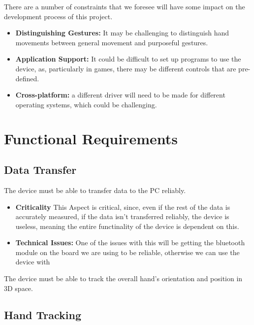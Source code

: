 \documentclass[12pt,a4paper,oneside]{book}
\theoremstyle{plain}
\numberwithin{equation}{chapter}
\newcounter{Chapnum}
\newcounter{Secnum}
\begin{document}
\noindent There are a number of constraints that we foresee will have some impact on the development process of this project.

\begin{itemize}
    \item \textbf{Distinguishing Gestures:} It may be challenging to distinguish hand movements between general movement and purposeful gestures.
    \item \textbf{Application Support:} It could be difficult to set up programs to use the device, as, particularly in games, there may be different controls that are pre-defined.
    \item \textbf{Cross-platform:} a different driver will need to be made for different operating systems, which could be challenging.
\end{itemize}

\chapter*{Functional Requirements}



\section{\textbf{Data Transfer}}

\noindent The device must be able to transfer data to the PC reliably.

\begin{itemize}
    \item \textbf{Criticality} This Aspect is critical, since, even if the rest of the data is accurately measured, if the data isn't transferred reliably, the device is useless, meaning the entire functinality of the device is dependent on this.
    \item \textbf{Technical Issues:} One of the issues with this will be getting the bluetooth module on the board we are using to be reliable, otherwise we can use the device with
\end{itemize}

\noindent The device must be able to track the overall hand's orientation and position in 3D space.

\section{\textbf{Hand Tracking}}
\end{document}
